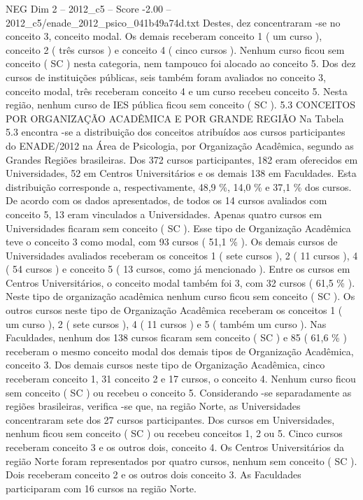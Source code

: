 \begin{textsample}{NEG Dim 2 – 2012\_c5 – Score -2.00 – 2012\_c5/enade\_2012\_psico\_041b49a74d.txt}
Destes, dez concentraram -se no conceito 3, conceito modal.
Os demais receberam conceito 1 ( um curso ), conceito 2 ( três cursos ) e conceito 4 ( cinco cursos ).
Nenhum curso ficou sem conceito ( SC ) nesta categoria, nem tampouco foi alocado ao conceito 5.
Dos dez cursos de instituições públicas, seis também foram avaliados no conceito 3, conceito modal, três receberam conceito 4 e um curso recebeu conceito 5.
Nesta região, nenhum curso de IES pública ficou sem conceito ( SC ). 5.3 CONCEITOS POR ORGANIZAÇÃO ACADÊMICA E POR GRANDE REGIÃO Na Tabela 5.3 encontra -se a distribuição dos conceitos atribuídos aos cursos participantes do ENADE/2012 na Área de Psicologia, por Organização Acadêmica, segundo as Grandes Regiões brasileiras.
Dos 372 cursos participantes, 182 eram oferecidos em Universidades, 52 em Centros Universitários e os demais 138 em Faculdades.
Esta distribuição corresponde a, respectivamente, 48,9 \%, 14,0 \% e 37,1 \% dos cursos.
De acordo com os dados apresentados, de todos os 14 cursos avaliados com conceito 5, 13 eram vinculados a Universidades.
Apenas quatro cursos em Universidades ficaram sem conceito ( SC ).
Esse tipo de Organização Acadêmica teve o conceito 3 como modal, com 93 cursos ( 51,1 \% ).
Os demais cursos de Universidades avaliados receberam os conceitos 1 ( sete cursos ), 2 ( 11 cursos ), 4 ( 54 cursos ) e conceito 5 ( 13 cursos, como já mencionado ).
Entre os cursos em Centros Universitários, o conceito modal também foi 3, com 32 cursos ( 61,5 \% ).
Neste tipo de organização acadêmica nenhum curso ficou sem conceito ( SC ).
Os outros cursos neste tipo de Organização Acadêmica receberam os conceitos 1 ( um curso ), 2 ( sete cursos ), 4 ( 11 cursos ) e 5 ( também um curso ).
Nas Faculdades, nenhum dos 138 cursos ficaram sem conceito ( SC ) e 85 ( 61,6 \% ) receberam o mesmo conceito modal dos demais tipos de Organização Acadêmica, conceito 3.
Dos demais cursos neste tipo de Organização Acadêmica, cinco receberam conceito 1, 31 conceito 2 e 17 cursos, o conceito 4.
Nenhum curso ficou sem conceito ( SC ) ou recebeu o conceito 5.
Considerando -se separadamente as regiões brasileiras, verifica -se que, na região Norte, as Universidades concentraram sete dos 27 cursos participantes.
Dos cursos em Universidades, nenhum ficou sem conceito ( SC ) ou recebeu conceitos 1, 2 ou 5.
Cinco cursos receberam conceito 3 e os outros dois, conceito 4.
Os Centros Universitários da região Norte foram representados por quatro cursos, nenhum sem conceito ( SC ).
Dois receberam conceito 2 e os outros dois conceito 3.
As Faculdades participaram com 16 cursos na região Norte.

\end{textsample}
